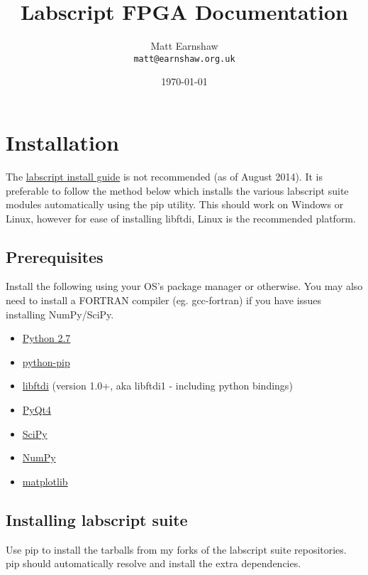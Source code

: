 \documentclass[11pt,a4paper]{article}
\begin{document}
\title{Labscript FPGA Documentation}
\author{Matt Earnshaw \\ \texttt{matt@earnshaw.org.uk}}
\date{\mydate\today}
\maketitle

\tableofcontents 
\newpage

\section{Installation}
The \href{https://bitbucket.org/labscript_suite/install-guide/src}{labscript install guide} is not recommended (as of August 2014). It is preferable to follow the method below which installs the various labscript suite modules automatically using the pip utility. This should work on Windows or Linux, however for ease of installing libftdi, Linux is the recommended platform.

\subsection{Prerequisites}
Install the following using your OS's package manager or otherwise. You may also need to install a FORTRAN compiler (eg. gcc-fortran) if you have issues installing NumPy/SciPy.

\begin{itemize}
\itemsep1pt\parskip0pt
\item \href{http://www.python.org}{Python 2.7}
\item \href{https://pypi.python.org/pypi/pip}{python-pip}
\item \href{http://www.intra2net.com/en/developer/libftdi/}{libftdi} (version 1.0+, aka libftdi1 - including python bindings)
\item \href{http://www.intra2net.com/en/developer/libftdi/}{PyQt4}
\item \href{http://www.scipy.org}{SciPy}
\item \href{http://www.numpy.org}{NumPy}
\item \href{http://www.matplotlib.org}{matplotlib}
\end{itemize}


\subsection{Installing labscript suite}
Use pip to install the tarballs from my forks of the labscript suite repositories. pip should automatically resolve and install the extra dependencies. 
\end{document}
